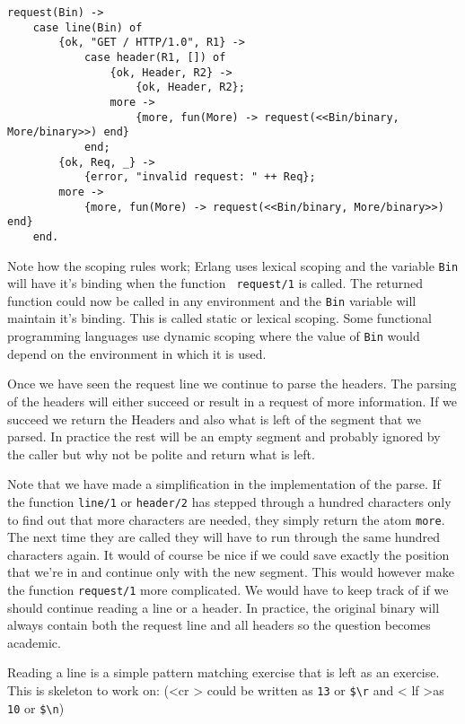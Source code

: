 \documentclass[a4paper,11pt]{article}
\begin{document}
\begin{verbatim}
request(Bin) ->
    case line(Bin) of
        {ok, "GET / HTTP/1.0", R1} ->
            case header(R1, []) of
                {ok, Header, R2} ->
                    {ok, Header, R2};
                more ->
                    {more, fun(More) -> request(<<Bin/binary, More/binary>>) end}
            end;
        {ok, Req, _} ->
            {error, "invalid request: " ++ Req};
        more ->
            {more, fun(More) -> request(<<Bin/binary, More/binary>>) end}
    end.
\end{verbatim}

Note how the scoping rules work; Erlang uses lexical scoping and the
variable {\tt Bin} will have it's binding when the function {\tt
  request/1} is called. The returned function could now be called in
any environment and the {\tt Bin} variable will maintain it's
binding. This is called static or lexical scoping. Some functional
programming languages use dynamic scoping where the value of {\tt Bin}
would depend on the environment in which it is used.

Once we have seen the request line we continue to parse the
headers. The parsing of the headers will either succeed or result in a
request of more information. If we succeed we return the Headers and
also what is left of the segment that we parsed. In practice the rest
will be an empty segment and probably ignored by the caller but why
not be polite and return what is left.

Note that we have made a simplification in the implementation of the
parse. If the function {\tt line/1} or {\tt header/2} has
stepped through a hundred characters only to find out that more
characters are needed, they simply return the atom {\tt more}. The
next time they are called they will have to run through the same
hundred characters again. It would of course be nice if we could save
exactly the position that we're in and continue only with the new
segment. This would however make the function {\tt request/1} more
complicated. We would have to keep track of if we should continue
reading a line or a header. In practice, the original binary will
always contain both the request line and all headers so the question
becomes academic.

Reading a line is a simple pattern matching exercise that is left as
an exercise. This is skeleton to work on: (\textless cr \textgreater
 could be written as {\tt 13} or {\tt \$\textbackslash r} and \textless
lf \textgreater as {\tt 10} or {\tt \$\textbackslash n})
\end{document}
